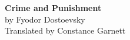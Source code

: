 \documentclass[12pt,twoside,openany,a5paper]{book}
\begin{document}
\thispagestyle{empty}
\vspace*{3cm}
\begin{center}
{\Huge \bfseries Crime and Punishment}\\[1cm]
{\Large by Fyodor Dostoevsky}\\[0.5cm]
{\normalsize Translated by Constance Garnett}\\[3cm]
\end{center}
\vfill
\clearpage
\end{document}
